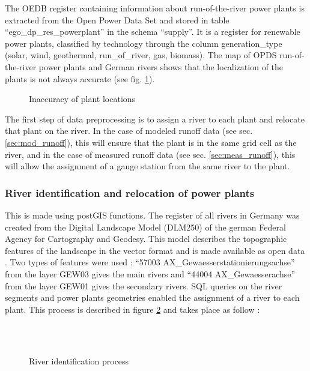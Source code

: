 The OEDB register containing information about run-of-the-river power plants is extracted from the Open Power Data Set and stored in table ``ego{\_}dp{\_}res{\_}powerplant'' in the schema ``supply''. It is a register for renewable power plants, classified by technology through the column generation{\_}type (solar, wind, geothermal, run{\_}of{\_}river, gas, biomass). The map of OPDS run-of-the-river power plants and German rivers shows that the localization of the plants is not always accurate (see fig. \ref{pp_river_dist}).
\begin{figure}[H]
\center
{}
\caption{Inaccuracy of plant locations}
\label{pp_river_dist}
\end{figure}
The first step of data preprocessing is to assign a river to each plant and relocate that plant on the river. \newline
In the case of modeled runoff data (see sec. \ref{sec:mod_runoff}), this will ensure that the plant is in the same grid cell as the river, and in the case of measured runoff data (see sec. \ref{sec:meas_runoff}), this will allow the assignment of a gauge station from the same river to the plant.


\subsubsection*{River identification and relocation of power plants}

This is made using postGIS functions. The register of all rivers in Germany was created from the Digital Landscape Model (DLM250) of the german Federal Agency for Cartography and Geodesy. This model describes the topographic features of the landscape in the vector format and is made available as open data \cite{dlm250}. \newline Two types of features were used : ``57003 AX{\_}Gewaesserstationierungsachse'' from the layer GEW03 gives the main rivers and ``44004 AX{\_}Gewaesserachse'' from the layer GEW01 gives the secondary rivers. \newline 
SQL queries on the river segments and power plants geometries enabled the assignment of a river to each plant. This process is described in figure \ref{river_id} and takes place as follow : 

\begin{figure}[H]
\begin{center}
   \hspace{3cm}
   \\
   \hspace{3cm}
   \\ 
\end{center}
\caption{River identification process}
\label{river_id}
\end{figure}

